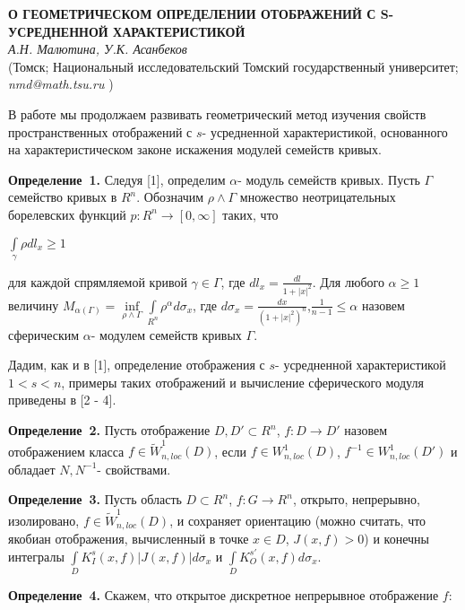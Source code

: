 \begin{center}{ \bf  О ГЕОМЕТРИЧЕСКОМ ОПРЕДЕЛЕНИИ ОТОБРАЖЕНИЙ С S- УСРЕДНЕННОЙ ХАРАКТЕРИСТИКОЙ}\\
{\it А.Н. Малютина, У.К. Асанбеков } \\
(Томск; Национальный исследовательский Томский государственный университет; {\it nmd@math.tsu.ru} )
\end{center}


В работе мы продолжаем развивать геометрический метод изучения свойств пространственных отображений с $s$- усредненной характеристикой, основанного на характеристическом законе искажения модулей семейств кривых.

\textbf{Определение~1.} Следуя [1], определим $\alpha$- модуль семейств кривых. Пусть $\Gamma$ семейство кривых в $R^{n}$. Обозначим $\rho\wedge\Gamma$ множество неотрицательных борелевских функций $p:R^{n}\rightarrow[0,\infty]$ таких, что
\begin{center}
	$\int\limits_{\gamma}\rho dl_{x}\geq1$
\end{center}

для каждой спрямляемой кривой $\gamma\in\Gamma$, где $dl_{x}=\frac{dl}{1+|x|^{2}}$. Для любого $\alpha\geq1$ величину	 $M_{\alpha(\Gamma)}=\inf\limits_{\rho\wedge\Gamma}\int\limits_{R^{n}}\rho^{\alpha}d\sigma_{x}$, где $d\sigma_{x}=\frac{dx}{(1+|x|^{2})^{n}}$,$\frac{1}{n-1}\leq\alpha$ назовем сферическим $\alpha$- модулем семейств кривых $\Gamma$.


Дадим, как и в [1], определение отображения с $s$- усредненной характеристикой $1<s<n$, примеры таких отображений и вычисление сферического модуля приведены в [2 - 4].

\textbf{Определение~2.} Пусть отображение $D, D'\subset R^{n}$, $f:D\rightarrow D'$ назовем отображением класса $f\in\tilde{W}^{1}_{n,loc}(D)$, если $f\in W^{1}_{n,loc}(D)$, $f^{-1}\in W^{1}_{n,loc}(D')$ и обладает $N,N^{-1}$- свойствами.


\textbf{Определение~3.} Пусть область $D\subset R^{n}$, $f:G\rightarrow R^{n}$, открыто, непрерывно, изолировано, $f\in\tilde{W}^{1}_{n,loc}(D)$, и сохраняет ориентацию (можно считать, что якобиан отображения, вычисленный в точке $x\in D$, $J(x,f)>0$) и конечны интегралы $\int\limits_{D}K_{I}^{s}(x,f)|J(x,f)|d\sigma_{x}$ и $\int\limits_{D}K_{O}^{s'}(x,f)d\sigma_{x}$.


\textbf{Определение~4.} Скажем, что открытое дискретное непрерывное отображение $f$:

